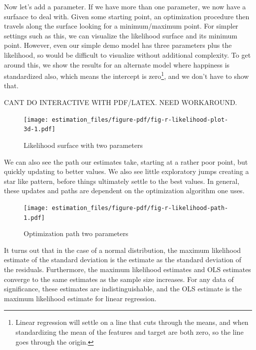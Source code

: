 \documentclass[
  letterpaper,
]{krantz}
\begin{document}
Now let's add a parameter. If we have more than one parameter, we now
have a surfaace to deal with. Given some starting point, an optimization
procedure then travels along the surface looking for a minimum/maximum
point. For simpler settings such as this, we can visualize the
likelihood surface and its minimum point. However, even our simple demo
model has three parameters plus the likelihood, so would be difficult to
visualize without additional complexity. To get around this, we show the
results for an alternate model where happiness is standardized also,
which means the intercept is zero\footnote{Linear regression will settle
  on a line that cuts through the means, and when standardizing the mean
  of the features and target are both zero, so the line goes through the
  origin.}, and we don't have to show that.

CANT DO INTERACTIVE WITH PDF/LATEX. NEED WORKAROUND.

\begin{figure}

{\centering \texttt{[image: estimation\_files/figure-pdf/fig-r-likelihood-plot-3d-1.pdf]}

}

\caption{\label{fig-r-likelihood-plot-3d}Likelihood surface with two
parameters}

\end{figure}

We can also see the path our estimates take, starting at a rather poor
point, but quickly updating to better values. We also see little
exploratory jumps creating a star like pattern, before things ultimately
settle to the best values. In general, these updates and paths are
dependent on the optimization algorithm one uses.

\begin{figure}

{\centering \texttt{[image: estimation\_files/figure-pdf/fig-r-likelihood-path-1.pdf]}

}

\caption{\label{fig-r-likelihood-path}Optimization path two parameters}

\end{figure}

It turns out that in the case of a normal distribution, the maximum
likelihood estimate of the standard deviation is the estimate as the
standard deviation of the residuals. Furthermore, the maximum likelihood
estimates and OLS estimates converge to the same estimates as the sample
size increases. For any data of significance, these estimates are
indistinguishable, and the OLS estimate is the maximum likelihood
estimate for linear regression.
\end{document}
